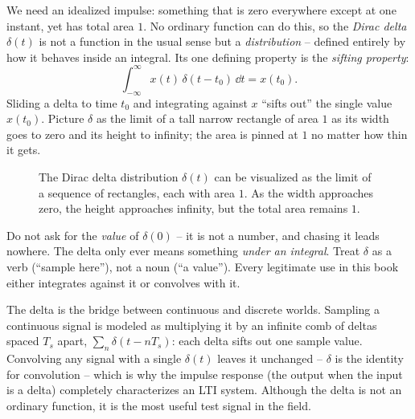 We need an idealized impulse: something that is zero everywhere except at one instant, yet has
total area $1$. No ordinary function can do this, so the \emph{Dirac delta} $\delta(t)$ is not a
function in the usual sense but a \emph{distribution} -- defined entirely by how it behaves inside
an integral. Its one defining property is the \emph{sifting property}:
\[
  \int_{-\infty}^{\infty} x(t)\,\delta(t - t_0)\,\dd t = x(t_0).
\]
Sliding a delta to time $t_0$ and integrating against $x$ ``sifts out'' the single value
$x(t_0)$. Picture $\delta$ as the limit of a tall narrow rectangle of area $1$ as its width goes
to zero and its height to infinity; the area is pinned at $1$ no matter how thin it gets.

\begin{figure}[H]
\centering
{}
\caption{The Dirac delta distribution $\delta(t)$ can be visualized as the limit of a sequence of rectangles, each with area $1$. As the width approaches zero, the height approaches infinity, but the total area remains $1$.}
\label{ch42:fig-delta}
\end{figure}


\begin{trapbox}
Do not ask for the \emph{value} of $\delta(0)$ -- it is not a number, and chasing it leads
nowhere. The delta only ever means something \emph{under an integral}. Treat $\delta$ as a verb
(``sample here''), not a noun (``a value''). Every legitimate use in this book either integrates
against it or convolves with it.
\end{trapbox}

\begin{happeningbox}
The delta is the bridge between continuous and discrete worlds. Sampling a continuous signal is
modeled as multiplying it by an infinite comb of deltas spaced $T_s$ apart, $\sum_n \delta(t -
nT_s)$: each delta sifts out one sample value. Convolving any signal with a single $\delta(t)$
leaves it unchanged -- $\delta$ is the identity for convolution -- which is why the impulse
response (the output when the input is a delta) completely characterizes an LTI system.
Although the delta is not an ordinary function, it is the most useful test signal in the field.
\end{happeningbox}

